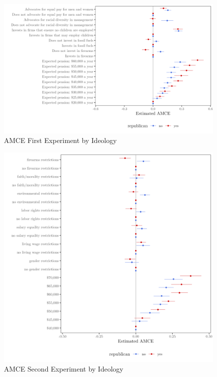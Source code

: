 \documentclass[
  12pt,
]{article}
\begin{document}
\begin{figure}

{\centering \includegraphics{amcecj1j_byr} 

}

\caption{AMCE First Experiment by Ideology}\label{fig:amce1byr}
\end{figure}

\begin{figure}

{\centering \includegraphics{amcecj2byr} 

}

\caption{AMCE Second Experiment by Ideology}\label{fig:amce2byr}
\end{figure}
\end{document}
